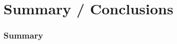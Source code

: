 \section{Summary / Conclusions}
\frametitle{Summary}

\begin{frame}

\begin{block}{}

\end{block}

\end{frame}